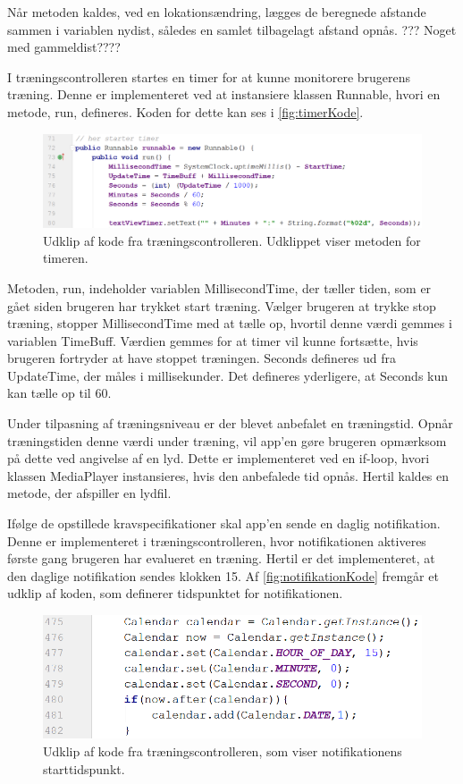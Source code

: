 Når metoden kaldes, ved en lokationsændring, lægges de beregnede afstande sammen i variablen nydist, således en samlet tilbagelagt afstand opnås. ??? Noget med gammeldist????




I træningscontrolleren startes en timer for at kunne monitorere brugerens træning. Denne er implementeret ved at instansiere klassen Runnable, hvori en metode, run, defineres. Koden for dette kan ses i \autoref{fig:timerKode}.

\begin{figure} [H]
\centering
\includegraphics[width=1\textwidth]{figures/imple/timerKode}
\caption{Udklip af kode fra træningscontrolleren. Udklippet viser metoden for timeren.}
\label{fig:timerKode}
\end{figure} 

\noindent
Metoden, run, indeholder variablen MillisecondTime, der tæller tiden, som er gået siden brugeren har trykket start træning. Vælger brugeren at trykke stop træning, stopper MillisecondTime med at tælle op, hvortil denne værdi gemmes i variablen TimeBuff.  Værdien gemmes for at timer vil kunne fortsætte, hvis brugeren fortryder at have stoppet træningen. Seconds defineres ud fra UpdateTime, der måles i millisekunder. Det defineres yderligere, at Seconds kun kan tælle op til 60.

Under tilpasning af træningsniveau er der blevet anbefalet en træningstid. Opnår træningstiden denne værdi under træning, vil app'en gøre brugeren opmærksom på dette ved angivelse af en lyd. Dette er implementeret ved en if-loop, hvori klassen MediaPlayer instansieres, hvis den anbefalede tid opnås. Hertil kaldes en metode, der afspiller en lydfil. 

Ifølge de opstillede kravspecifikationer skal app'en sende en daglig notifikation. Denne er implementeret i træningscontrolleren, hvor notifikationen aktiveres første gang brugeren har evalueret en træning. Hertil er det implementeret, at den daglige notifikation sendes klokken 15. Af \autoref{fig:notifikationKode} fremgår et udklip af koden, som definerer tidspunktet for notifikationen. 

\begin{figure} [H]
\centering
\includegraphics[width=1\textwidth]{figures/imple/notifikationKode}
\caption{Udklip af kode fra træningscontrolleren, som viser notifikationens starttidspunkt.}
\label{fig:notifikationKode}
\end{figure} 







